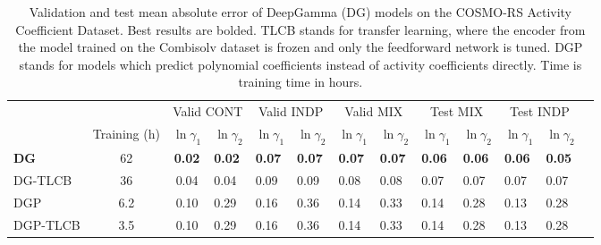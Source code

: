 \begin{table}
    \centering
    \caption{Validation and test mean absolute error of DeepGamma (DG) models on the COSMO-RS Activity  Coefficient Dataset. Best results are bolded. TLCB stands for transfer learning, where the encoder from the model trained on the Combisolv dataset is frozen and only the feedforward network is tuned. DGP stands for models which predict polynomial coefficients instead of activity coefficients directly. Time is training time in hours.}
    \label{cosmo_rs_results}
    \begin{tabular}{lccllllllllll}
        & & \multicolumn{2}{c}{Valid CONT} &  \multicolumn{2}{c}{Valid  INDP}  &  \multicolumn{2}{c}{Valid MIX}  &\multicolumn{2}{c}{Test MIX} &  \multicolumn{2}{c}{Test  INDP} \\
        & Training (h) & $\ln\gamma_1$ & $\ln\gamma_2$ & $\ln\gamma_1$ & $\ln\gamma_2$ & $\ln\gamma_1$ & $\ln\gamma_2$ & $\ln\gamma_1$ & $\ln\gamma_2$ & $\ln\gamma_1$ & $\ln\gamma_2$ \\
        \hline 
        \textbf{DG}  &     62           & \textbf{0.02 }                               & \textbf{0.02  }                              & \textbf{0.07}                                & \textbf{0.07}                                & \textbf{0.07 }                               & \textbf{0.07  }                              &\textbf{ 0.06  }                              & \textbf{0.06  }                              & \textbf{0.06   }                             & \textbf{0.05 }                               \\
        DG-TLCB &  36    & 0.04                                & 0.04                                & 0.09                                & 0.09                                & 0.08                                & 0.08                                & 0.07                                & 0.07                                & 0.07                                & 0.07                                \\
        DGP &    6.2      & 0.10                                & 0.29                                & 0.16                                & 0.36                                & 0.14                                & 0.33                                & 0.14                                & 0.28                                & 0.13                                & 0.28                                \\
        DGP-TLCB & 3.5 & 0.10                                & 0.29                                & 0.16                                & 0.36                                & 0.14                                & 0.33                                & 0.14                                & 0.28                                & 0.13                                & 0.28                               
    \end{tabular}
\end{table}

